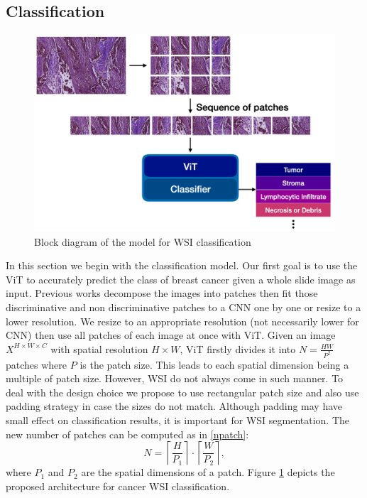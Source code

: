 \documentclass[review]{cvpr}
\begin{document}
\subsection{Classification}
\begin{figure}[ht]
\begin{center}
   \includegraphics[width=0.8\linewidth]{media/classify-new.png}
\end{center}
   \caption{Block diagram of the model for WSI classification}
\label{fig:cls}
\end{figure}
In this section we begin with the classification model. Our first goal is to use the ViT to accurately predict the class of breast cancer given a whole slide image as input. Previous works \cite{7780635} decompose the images into patches then fit those discriminative and non discriminative patches to a CNN one by one or resize to a lower resolution. We resize to an appropriate resolution (not necessarily lower for CNN) then use all patches of each image at once with ViT. Given an image $X^{H \times W \times C}$ with spatial resolution ${H \times W}$, ViT firstly divides it into $N = \frac{HW}{P^2}$ patches where $P$ is the patch size. This leads to each spatial dimension being a multiple of patch size. However, WSI do not always come in such manner. To deal with the design choice we propose to use rectangular patch size and also use padding strategy in case the sizes do not match. Although padding may have small effect on classification results, it is important for WSI segmentation. The new number of patches can be computed as in \ref{npatch}:
\begin{equation}
    N= \left\lceil\frac{H}{P_1}\right\rceil \cdot \left\lceil\frac{W}{P_2}\right\rceil,
    \label{npatch}
\end{equation}
where $P_1$ and $P_2$ are the spatial dimensions of a patch. Figure \ref{fig:cls} depicts the proposed architecture for cancer WSI classification.
\end{document}
